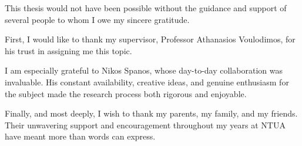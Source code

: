 \begin{acknowledgements}
This thesis would not have been possible without the guidance and support of several people to whom I owe my sincere gratitude.

First, I would like to thank my supervisor, Professor Athanasios Voulodimos, for his trust in assigning me this topic.

I am especially grateful to Nikos Spanos, whose day-to-day collaboration was invaluable. His constant availability, creative ideas, and genuine enthusiasm for the subject made the research process both rigorous and enjoyable.

Finally, and most deeply, I wish to thank my parents, my family, and my friends. Their unwavering support and encouragement throughout my years at NTUA have meant more than words can express.

\end{acknowledgements}
